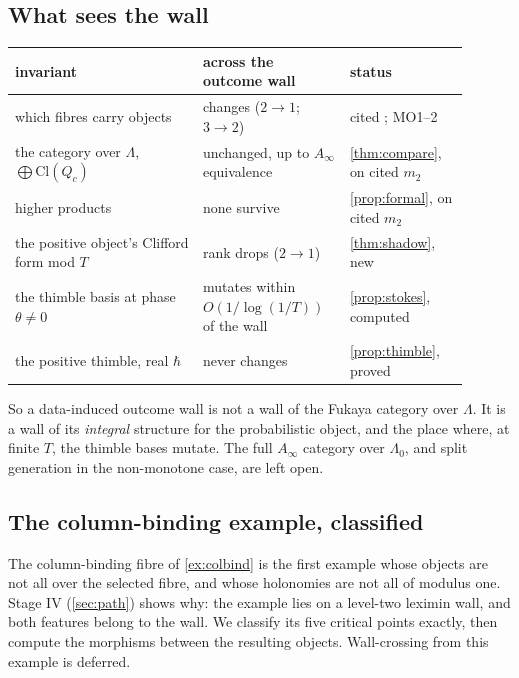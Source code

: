 \documentclass[11pt]{article}
\theoremstyle{definition}\newtheorem{definition}[theorem]{Definition}\newtheorem{remark}[theorem]{Remark}\newtheorem{example}[theorem]{Example}\newtheorem{problem}[theorem]{Open problem}\crefname{problem}{Problem}{Problems}
\begin{document}
\subsection{What sees the wall}
\begin{center}\small
\begin{tabular}{>{\raggedright\arraybackslash}p{0.38\linewidth}>{\raggedright\arraybackslash}p{0.28\linewidth}>{\raggedright\arraybackslash}p{0.24\linewidth}}\toprule
invariant & across the outcome wall & status\\\midrule
which fibres carry objects & changes ($2\to1$; $3\to2$) & cited \cite{ChoOh2006}; MO1--2\\
the category over $\Lambda$, $\bigoplus\mathrm{Cl}(Q_c)$ & unchanged, up to $A_\infty$ equivalence & \cref{thm:compare}, on cited $m_2$\\
higher products & none survive & \cref{prop:formal}, on cited $m_2$\\
the positive object's Clifford form mod $T$ & rank drops ($2\to1$) & \cref{thm:shadow}, new\\
the thimble basis at phase $\theta\ne0$ & mutates within $O(1/\log(1/T))$ of the wall & \cref{prop:stokes}, computed\\
the positive thimble, real $\hbar$ & never changes & \cref{prop:thimble}, proved\\\bottomrule
\end{tabular}
\end{center}
So a data-induced outcome wall is not a wall of the Fukaya category over $\Lambda$. It is a wall of its \emph{integral} structure for the probabilistic object, and the place where, at finite $T$,
the thimble bases mutate. The full $A_\infty$ category over $\Lambda_0$, and split generation in the non-monotone case, are left open.

\subsection{The column-binding example, classified}\label{sec:cbclass}
The column-binding fibre of \cref{ex:colbind} is the first example whose objects are not all over the selected fibre, and whose holonomies are not all of modulus one. Stage IV (\cref{sec:path}) shows why: the example lies on a level-two leximin wall, and both features belong to the wall. We classify
its five critical points exactly, then compute the morphisms between the resulting objects. Wall-crossing from this example is deferred.
\end{document}
